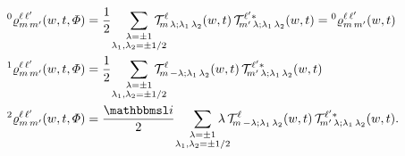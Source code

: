 \begin{align}
  \prescript{0}{}{\varrho}^{\ell\, \ell'}_{m\, m'}(w, t, \Phi)
  ={}& \frac{1}{2}\quad \sum_{\substack{\lambda = \pm 1 \\ \mathclap{\lambda_1, \lambda_2 = \pm 1/2}}}
  \mathcal{T}^\ell_{\!m\, \lambda; \lambda_1\, \lambda_2}(w, t)\,
  \mathcal{T}^{\ell' *}_{\!m'\, \lambda; \lambda_1\, \lambda_2}(w, t)
  = \prescript{0}{}{\varrho}^{\ell\, \ell'}_{m\, m'}(w, t)
  \\
  \prescript{1}{}{\varrho}^{\ell\, \ell'}_{m\, m'}(w, t, \Phi)
  ={}& \frac{1}{2}\quad \sum_{\substack{\lambda = \pm 1 \\ \mathclap{\lambda_1, \lambda_2 = \pm 1/2}}}
  \mathcal{T}^\ell_{\!m\, {-\lambda}; \lambda_1\, \lambda_2}(w, t)\,
  \mathcal{T}^{\ell' *}_{\!m'\, \lambda; \lambda_1\, \lambda_2}(w, t)
  \\
  \prescript{2}{}{\varrho}^{\ell\, \ell'}_{m\, m'}(w, t, \Phi)
  ={}& \frac{\imag}{2}\quad \sum_{\substack{\lambda = \pm 1 \\ \mathclap{\lambda_1, \lambda_2 = \pm 1/2}}}
  \lambda\,
  \mathcal{T}^\ell_{\!m\, {-\lambda}; \lambda_1\, \lambda_2}(w, t)\,
  \mathcal{T}^{\ell' *}_{\!m'\, \lambda; \lambda_1\, \lambda_2}(w, t).
\end{align}

